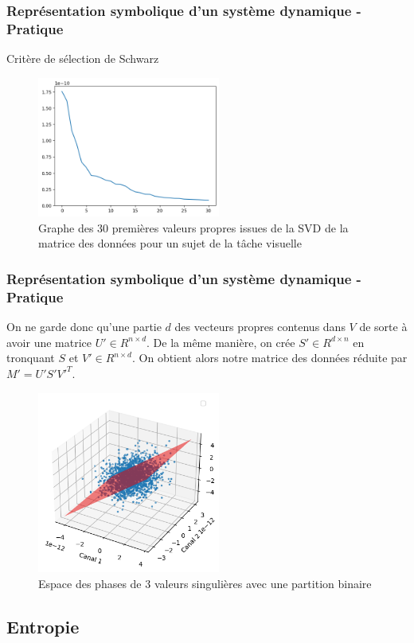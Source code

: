 \documentclass{beamer}
\begin{document}
\begin{frame}
\frametitle{Représentation symbolique d'un système dynamique - Pratique}
Critère de sélection de Schwarz
\begin{figure}[!ht]
    \centering
    \includegraphics[width=6cm]{30vp.png}
    \caption{Graphe des 30 premières valeurs propres issues de la SVD de la matrice des données pour un sujet de la tâche visuelle}
    \label{fig4.3}
\end{figure}
\end{frame}

\begin{frame}
\frametitle{Représentation symbolique d'un système dynamique - Pratique}
On ne garde donc qu'une partie $d$ des vecteurs propres contenus dans $V$ de sorte à avoir une matrice $U' \in {R}^{n \times d}$. De la même manière, on crée $S' \in {R}^{d \times n}$ en tronquant $S$ et $V' \in {R}^{n \times d}$. On obtient alors notre matrice des données réduite par $M' = U'S'V'^T$.
\begin{figure}[!ht]
    \centering
    \includegraphics[width=6cm]{representation_espace_des_phases.png}
    \caption{Espace des phases de 3 valeurs singulières avec une partition binaire}
    \label{fig4.4}
\end{figure}
\end{frame}

\subsection{Entropie}
\end{document}
